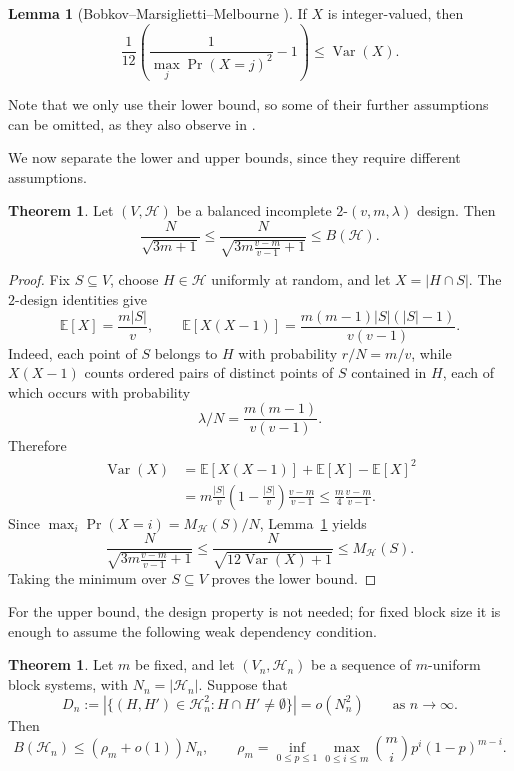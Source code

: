 \documentclass[10pt]{article}
\theoremstyle{definition}
\newtheorem{theorem}[thm]{Theorem}
\newtheorem{lemma}[thm]{Lemma}
\begin{document}
	\begin{lemma}[Bobkov--Marsiglietti--Melbourne
		{\cite[Theorem~1.1]{BMM}}]
		\label{lem:maximum-atom}
		If \(X\) is integer-valued, then
		\[
		\ensuremath{\frac{1}{12}\left(\frac{1}{\max_j\Pr(X=j)^2}-1\right)
			\leq\operatorname{Var}(X)}.
		\]
	\end{lemma}
	Note that we only use their lower bound, so some of their further assumptions can be omitted, as they also observe in \cite {BMM}.
	
	We now separate the lower and upper bounds, since they require different assumptions.
	
	\begin{theorem}
		\label{thm:design-lower}
		Let \((V,\mathcal H)\) be a balanced incomplete
		\(2\text{-}(v,m,\lambda)\) design. Then
		\[
		\frac{N}{\sqrt{3m+1}}\leq \frac{N}{\sqrt{3m\frac{v-m}{v-1}+1}}\leq B(\mathcal H).
		\]
	\end{theorem}
	
	\begin{proof}
		Fix \(S\subseteq V\), choose \(H\in\mathcal H\) uniformly at random,
		and let \(X=|H\cap S|\). The \(2\)-design identities give
		\[
		\mathbb E[X]=\frac{m|S|}{v},
		\qquad
		\mathbb E[X(X-1)]
		=\frac{m(m-1)|S|(|S|-1)}{v(v-1)}.
		\]
		Indeed, each point of \(S\) belongs to \(H\) with probability
		\(r/N=m/v\), while \(X(X-1)\) counts ordered pairs of distinct
		points of \(S\) contained in \(H\), each of which occurs with probability
		$$\lambda/N=\frac{m(m-1)}{v(v-1)}.$$ Therefore
		\[
		\begin{aligned}
			\operatorname{Var}(X)
			&=\mathbb E[X(X-1)]+\mathbb E[X]-\mathbb E[X]^2\\
			&=m\frac{|S|}{v}\left(1-\frac{|S|}{v}\right)
			\frac{v-m}{v-1}
			\leq\frac{m}{4}\frac{v-m}{v-1}.
		\end{aligned}
		\]
		Since \(\max_i\Pr(X=i)=M_{\mathcal H}(S)/N\),
		Lemma~\ref{lem:maximum-atom} yields
		\[
		\frac{N}{\sqrt{3m\frac{v-m}{v-1}+1}}
		\leq\frac{N}{\sqrt{12\operatorname{Var}(X)+1}} \leq M_{\mathcal H}(S)
		.
		\]
		Taking the minimum over \(S\subseteq V\) proves the lower bound.
	\end{proof}
	
	For the upper bound, the design property is not needed; for fixed block size it is enough to assume the following weak dependency condition.
	
	\begin{theorem}
		\label{thm:fixed-upper}
		\label{thm:general-hypergraph}
		Let \(m\) be fixed, and let \((V_n,\mathcal H_n)\) be a sequence of
		\(m\)-uniform block systems, with \(N_n=|\mathcal H_n|\). Suppose that
		\[
		D_n:=|\{(H,H')\in\mathcal H_n^2:H\cap H'\neq\emptyset\}|
		=o(N_n^2)
		\qquad\text{as }n\to\infty.
		\]
		Then
		\[
		B(\mathcal H_n)\leq (\rho_m+o(1))N_n,
		\qquad
		\rho_m=\inf_{0\leq p\leq1}\max_{0\leq i\leq m}
		\binom mi p^i(1-p)^{m-i}.
		\]
	\end{theorem}
	
\end{document}
